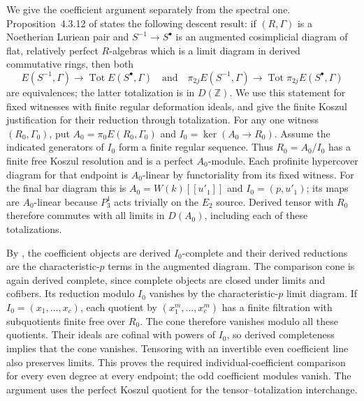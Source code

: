 \documentclass[11pt]{article}
\numberwithin{equation}{section}
\theoremstyle{definition}
\theoremstyle{remark}
\newcommand{\Z}{\mathbb Z}
\begin{document}
We give the coefficient argument separately from the spectral one.
Proposition~4.3.12 of \cite{BMR2026} states the following descent result:
if $(R,\Gamma)$ is a Noetherian Luriean pair and
$S^{-1}\to S^{\bullet}$ is an augmented cosimplicial diagram of flat,
relatively perfect $R$-algebras which is a limit diagram in derived
commutative rings, then both
\[
 E(S^{-1},\Gamma)\longrightarrow
       \operatorname{Tot} E(S^{\bullet},\Gamma)
 \quad\text{and}\quad
 \pi_{2j}E(S^{-1},\Gamma)\longrightarrow
       \operatorname{Tot}\pi_{2j}E(S^{\bullet},\Gamma)
\]
are equivalences; the latter totalization is in $D(\Z)$.
We use this statement for fixed witnesses with finite regular deformation
ideals, and give the finite Koszul justification for their reduction
through totalization.
For any one witness $(R_0,\Gamma_0)$, put
$A_0=\pi_0E(R_0,\Gamma_0)$ and $I_0=\ker(A_0\to R_0)$.
Assume the indicated generators of $I_0$ form a finite regular sequence.
Thus $R_0=A_0/I_0$ has a finite free Koszul resolution and is a perfect
$A_0$-module. Each profinite hypercover diagram for that endpoint is
$A_0$-linear by functoriality from its fixed witness. For the final bar diagram this is
$A_0=W(k)[[u'_1]]$ and $I_0=(p,u'_1)$; its maps are $A_0$-linear
because $P_3^1$ acts trivially on the $E_2$ source.
Derived tensor with $R_0$ therefore commutes with all limits in
$D(A_0)$, including each of these totalizations.

By \cite[Lemma~4.2.12]{BMR2026}, the coefficient objects are derived
$I_0$-complete and their derived reductions are the characteristic-$p$
terms in the augmented diagram. The comparison cone is again derived
complete, since complete objects are closed under limits and cofibers.
Its reduction modulo $I_0$ vanishes by the characteristic-$p$ limit
diagram. If $I_0=(x_1,\ldots,x_c)$, each quotient by
$(x_1^m,\ldots,x_c^m)$ has a finite filtration with subquotients finite
free over $R_0$. The cone therefore vanishes modulo all these quotients.
Their ideals are cofinal with powers of $I_0$, so derived completeness
implies that the cone vanishes. Tensoring with an invertible even
coefficient line also preserves limits. This proves the required
individual-coefficient comparison for every even degree at every
endpoint; the odd coefficient modules vanish. The argument uses the
perfect Koszul quotient for the tensor--totalization interchange.
\end{document}
